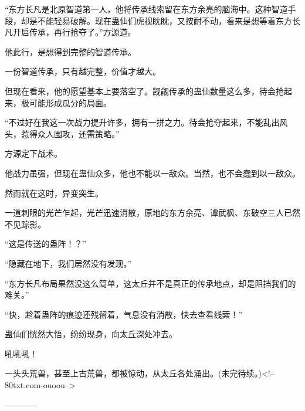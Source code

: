 \begin{this_body}
“东方长凡是北原智道第一人，他将传承线索留在东方余亮的脑海中。这种智道手段，却是不能轻易破解。现在蛊仙们虎视眈眈，又按耐不动，看来是想等着东方长凡开启传承，再行抢夺了。”方源道。

他此行，是想得到完整的智道传承。

一份智道传承，只有越完整，价值才越大。

但现在看来，他的愿望基本上要落空了。觊觎传承的蛊仙数量这么多，待会抢起来，极可能形成瓜分的局面。

“不过好在我这一次战力提升许多，拥有一拼之力。待会抢夺起来，不能乱出风头，惹得众人围攻，还需策略。”

方源定下战术。

他战力虽强，但现在蛊仙众多，他也不能以一敌众。当然，也不会蠢到以一敌众。

然而就在这时，异变突生。

一道刺眼的光芒乍起，光芒迅速消散，原地的东方余亮、谭武枫、东破空三人已然不见踪影。

“这是传送的蛊阵！？”

“隐藏在地下，我们居然没有发现。”

“东方长凡布局果然没这么简单，这太丘并不是真正的传承地点，却是阻挡我们的难关。”

“快，趁着蛊阵的痕迹还残留着，气息没有消散，快去查看线索！”

蛊仙们恍然大悟，纷纷现身，向太丘深处冲去。

吼吼吼！

一头头荒兽，甚至上古荒兽，都被惊动，从太丘各处涌出。(未完待续。)<!--80txt.com-ouoou-->

------------

\end{this_body}

